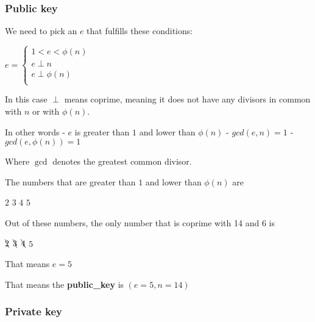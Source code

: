 \documentclass[11pt]{article}
\begin{document}
    \hypertarget{public-key}{%
\subsubsection{Public key}\label{public-key}}

    We need to pick an \(e\) that fulfills these conditions:

\(e=\left\{  \begin{array}{ll}  1 < e < \phi(n)\\  e \perp n\\  e \perp \phi(n)\\  \end{array}  \right.\)

In this case \(\perp\) means coprime, meaning it does not have any
divisors in common with \(n\) or with \(\phi(n)\).

In other words - \(e\) is greater than \(1\) and lower than \(\phi(n)\)
- \(gcd(e, n) = 1\) - \(gcd(e, \phi(n)) = 1\)

Where \(\gcd\) denotes the greatest common divisor.

    The numbers that are greater than \(1\) and lower than \(\phi(n)\) are

\(2\) \(3\) \(4\) \(5\)

    Out of these numbers, the only number that is coprime with 14 and 6 is

\(\bcancel2\) \(\bcancel3\) \(\bcancel4\) \(5\)

    That means \(e = 5\)

    That means the \textbf{public\_key} is \((e = 5, n = 14)\)

    \hypertarget{private-key}{%
\subsubsection{Private key}\label{private-key}}


    
    
    
    
\end{document}
